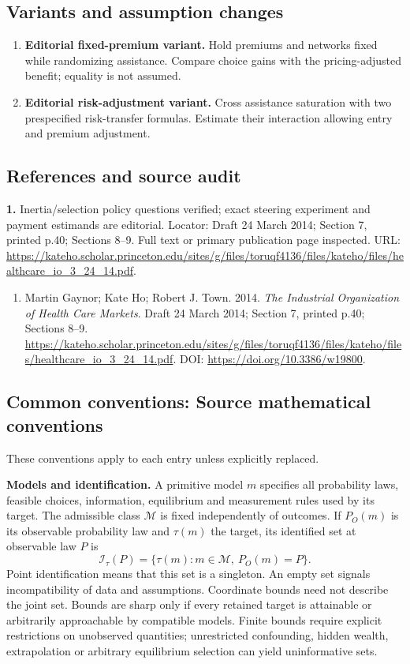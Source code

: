 \documentclass[11pt,a4paper]{article}
\begin{document}
\subsection*{Variants and assumption changes}
\begin{enumerate}
\item \textbf{Editorial fixed-premium variant.} Hold premiums and networks fixed while randomizing assistance. Compare choice gains with the pricing-adjusted benefit; equality is not assumed.
\item \textbf{Editorial risk-adjustment variant.} Cross assistance saturation with two prespecified risk-transfer formulas. Estimate their interaction allowing entry and premium adjustment.
\end{enumerate}
\subsection*{References and source audit}
\textbf{1.} Inertia/selection policy questions verified; exact steering experiment and payment estimands are editorial. Locator: Draft 24 March 2014; Section 7, printed p.40; Sections 8–9. Full text or primary publication page inspected. URL: \url{https://kateho.scholar.princeton.edu/sites/g/files/toruqf4136/files/kateho/files/healthcare_io_3_24_14.pdf}.
\begin{enumerate}\raggedright
\item\hypertarget{definitions:source:30007724:1}{} Martin Gaynor; Kate Ho; Robert J. Town. 2014. \emph{The Industrial Organization of Health Care Markets}. Draft 24 March 2014; Section 7, printed p.40; Sections 8–9.
\url{https://kateho.scholar.princeton.edu/sites/g/files/toruqf4136/files/kateho/files/healthcare_io_3_24_14.pdf}.
DOI: \url{https://doi.org/10.3386/w19800}.
\end{enumerate}

\subsection*{Common conventions: Source mathematical conventions}

These conventions apply to each entry unless explicitly replaced.

\textbf{Models and identification.} A primitive model \(m\) specifies all probability laws, feasible choices, information, equilibrium and measurement rules used by its target. The admissible class \(\mathcal M\) is fixed independently of outcomes. If \(P_O(m)\) is its observable probability law and \(\tau(m)\) the target, its identified set at observable law \(P\) is
\[
 \mathcal I_\tau(P)=\{\tau(m):m\in\mathcal M,\ P_O(m)=P\}.
\]
Point identification means that this set is a singleton. An empty set signals incompatibility of data and assumptions. Coordinate bounds need not describe the joint set. Bounds are sharp only if every retained target is attainable or arbitrarily approachable by compatible models. Finite bounds require explicit restrictions on unobserved quantities; unrestricted confounding, hidden wealth, extrapolation or arbitrary equilibrium selection can yield uninformative sets.
\end{document}
